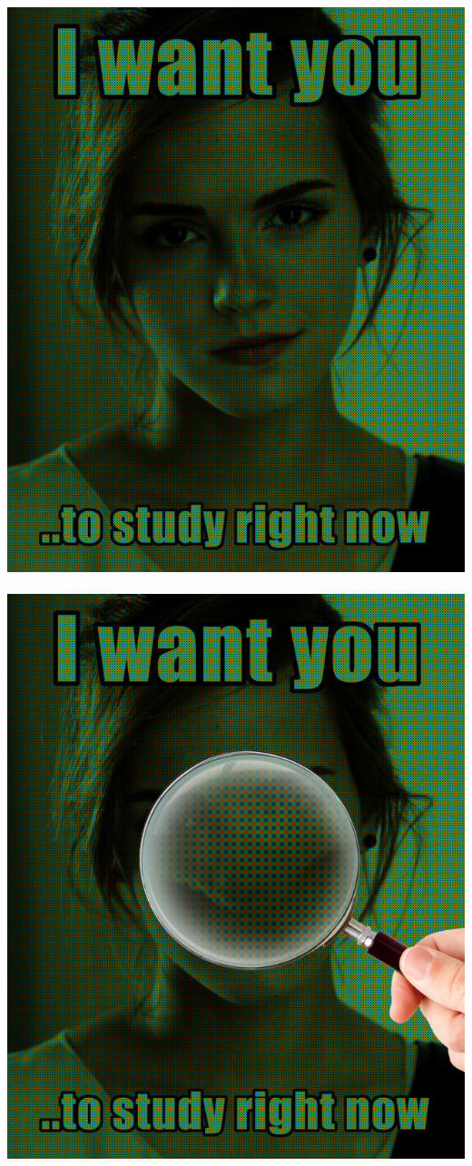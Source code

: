 	\par 
	\begin{center}
		\includegraphics[scale=0.3]{./img/mosaic_emma.png} \ \ \includegraphics[scale=0.3]{./img/mosaic_emma_lupa.png}

\end{center}
